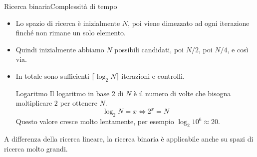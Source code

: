 \documentclass{beamer}
\begin{document}
\begin{frame}{Ricerca binaria}{Complessit\`a di tempo}
    \begin{itemize}
        \item Lo spazio di ricerca \`e inizialmente $N$, poi viene dimezzato ad ogni iterazione finch\'e non rimane un solo elemento.
        \pause
        \item Quindi inizialmente abbiamo $N$ possibili candidati, poi $N/2$, poi $N/4$, e cos\`i via.
        \pause
        \item In totale sono sufficienti $\lceil \log_2 N \rceil$ iterazioni e controlli.
        \begin{exampleblock}{Logaritmo}
        Il logaritmo in base 2 di $N$ \`e il numero di volte che bisogna moltiplicare $2$ per ottenere $N$.
        $$\log_2 N = x \iff 2^x = N$$
        Questo valore cresce molto lentamente, per esempio $\log_2 10^6 \approx 20$.
        \end{exampleblock}
    \end{itemize}
    \pause
    \break
    A differenza della ricerca lineare, la ricerca binaria \`e applicabile anche su spazi di ricerca molto grandi.
\end{frame}
\end{document}
